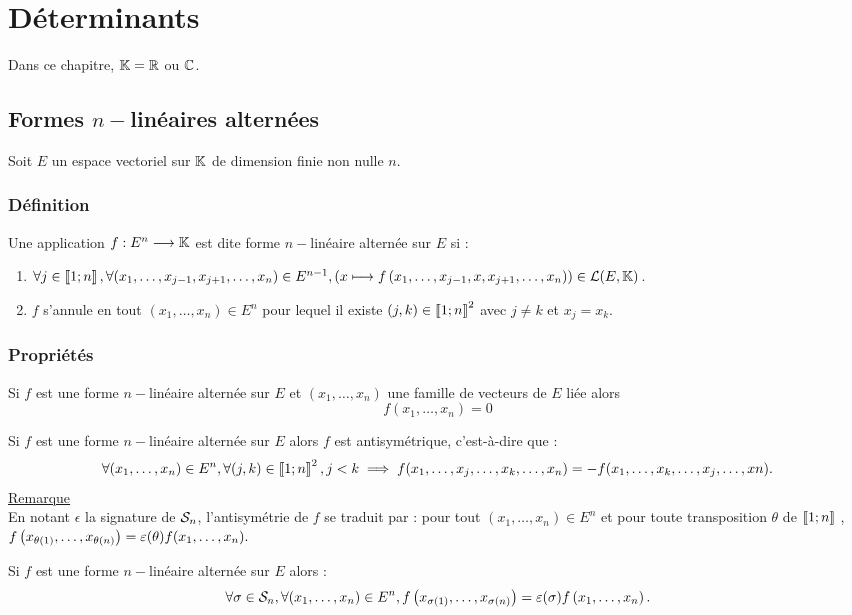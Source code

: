 \chapter{Déterminants}

\minitoc

Dans ce chapitre, \(\K = \R\) ou \(\C\).
\section{Formes \(n-\)linéaires alternées}
Soit \(E\) un espace vectoriel sur \(\K\) de dimension finie non nulle \(n\).
\subsection{Définition}
\begin{defi}
    Une application \(f : E^n \to \K\) est dite forme \(n-\)linéaire alternée sur \(E\) si :
    \begin{enumerate}
        \item \(\forall j \in  \interventierii{1}{n} , \forall  (x_1, \dots  , x_{j-1}, x_{j+1}, \dots  , x_n) \in  E^{n-1}, (x \mapsto f \paren{x_1, \dots  , x_{j-1}, x, x_{j+1}, \dots  , x_n}) \in  \cal{L} (E, \K)\).
        \item \(f\) s’annule en tout \((x_1, \dots  , x_n) \in  E^n\) pour lequel il existe \((j, k) \in  \interventierii{1}{n}^2 \) avec \(j\neq k\) et \(x_j = x_k\).
    \end{enumerate}
\end{defi}
\subsection{Propriétés}
\begin{defprop}
    Si \(f\) est une forme \(n-\)linéaire  alternée sur \(E\) et \((x_1, \dots  , x_n)\) une famille de vecteurs de \(E\) liée alors \[f (x_1, \dots  , x_n) = 0\]
\end{defprop}
\begin{defprop}[Antisymétrie]
    Si \(f\) est une forme \(n-\)linéaire  alternée sur \(E\) alors \(f\) est antisymétrique, c’est-à-dire que :
    \[\forall  (x_1, \dots  , x_n) \in  E^n, \forall  (j, k) \in  \interventierii{1}{n}^2, j < k \imp f (x_1, \dots  , x_j , \dots  , x_k, \dots  , x_n) = -f (x_1, \dots  , x_k, \dots  , x_j , \dots  , xn) .\]
    \underline{Remarque}\\
    En notant \(\epsilon\)  la signature de \(\cal{S}_n\), l’antisymétrie de \(f\) se traduit par : pour tout \((x_1, \dots  , x_n) \in  E^n\) et pour toute transposition \(\theta\) de \(\interventierii{1}{n}\) , \(f\paren{x_{\theta (1)}, \dots  , x_{\theta (n)}} = \epsilon (\theta )f (x_1, \dots  , x_n) .\)
\end{defprop}
\begin{defprop}
    Si \(f\) est une forme \(n-\)linéaire  alternée sur \(E\) alors :
    \[\forall \sigma  \in  \cal{S}_n, \forall  (x_1, \dots  , x_n) \in  E^n, f \paren{ x_{\sigma (1)}, \dots  , x_{\sigma (n)}} = \epsilon (\sigma )f \paren{x_1, \dots  , x_n} .\]
\end{defprop}

